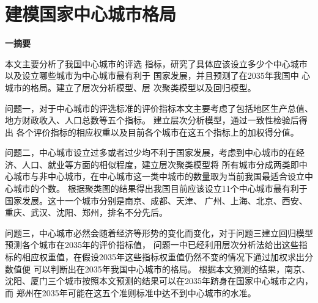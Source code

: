 \documentclass[openany,oneside]{ctexbook}
\begin{document}
\makeatletter
\newcommand\Csub{\@startsection{subsection}{2}%
 {0pt}{-\baselineskip}{.2\baselineskip}%
 {\centering\itshape}}
\newcommand\Lsub{\@startsection{subsection}{2}%
 {0pt}{-\baselineskip}{.2\baselineskip}%
 {\raggedright\sffamily}}
\newcommand\Rsub{\@startsection{subsection}{2}%
 {0pt}{-\baselineskip}{.2\baselineskip}%
 {\raggedleft\MakeUppercase}}
\newcommand\Hsub{\@startsection{subsection}{2}%
 {0pt}{-\baselineskip}{.2\baselineskip}%
 {\hrule\medskip\itshape}}
\makeatother

\pagestyle{empty} %

\mainmatter
\frontmatter
\renewcommand{\thepage}{\arabic{page}} %



\setcounter{page}{1}


\chapter{\sihao\hei \quad 建模国家中心城市格局}
\begin{center}
   
      {\textbf{\sihao\hei \quad 一\quad 摘要}}
\end{center}
本文主要分析了我国中心城市的评选
指标，研究了具体应该设立多少个中心城市
以及设立哪些城市为中心城市最有利于
国家发展，并且预测了在2035年我国中
心城市的格局。建立了层次分析模型、层
次聚类模型以及回归模型。

问题一，对于中心城市的评选标准的评价指标本文主要考虑了包括地区生产总值、地方财政收入、人口总数等五个指标。
建立层次分析模型，通过一致性检验后得出
各个评价指标的相应权重以及目前各个城市在这五个指标上的加权得分值。

问题二，中心城市设立过多或者过少均不利于国家发展，考虑到中心城市的在经济、人口、就业等方面的相似程度，建立层次聚类模型将
所有城市分成两类即中心城市与非中心城市，在中心城市这一类中城市的数量取为当前我国最适合设立中心城市的个数。
根据聚类图的结果得出我国目前应该设立11个中心城市最有利于国家发展。这十一个城市分别是南京、成都、天津、
广州、上海、北京、西安、重庆、武汉、沈阳、郑州，排名不分先后。




问题三，中心城市必然会随着经济等形势的变化而变化，对于问题三建立回归模型预测各个城市在2035年的评价指标值，
问题一中已经利用层次分析法给出这些指标的相应权重值，在假设2035年这些指标权重值仍然不变的情况下通过加权求出分数值便
可以判断出在2035年我国中心城市的格局。
根据本文预测的结果，南京、沈阳、厦门三个城市按照本文预测的结果可以在2035年跻身在国家中心城市之内，而
郑州在2035年可能在这五个准则标准中达不到中心城市的水准。
\end{document}
